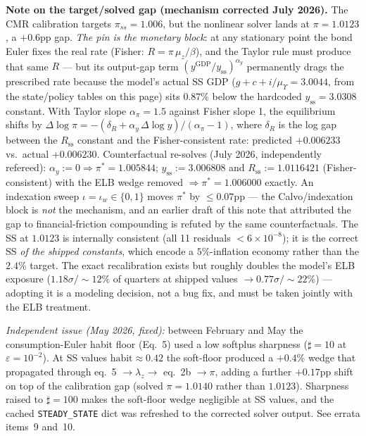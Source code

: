 \documentclass[11pt]{article}
\begin{document}
\begin{table}[h!]
\begin{minipage}[t]{0.45\linewidth}
\textbf{Note on the target/solved gap (mechanism corrected July 2026).}
The CMR calibration targets $\pi_{ss} = 1.006$, but the nonlinear solver
lands at $\pi = 1.0123$, a $+0.6$pp gap. \emph{The pin is the monetary
block}: at any stationary point the bond Euler fixes the real rate
(Fisher: $R = \pi\,\mu_z/\beta$), and the Taylor rule must produce that
same $R$ --- but its output-gap term $(y^{\text{GDP}}/y_{\text{ss}})^{\alpha_y}$
permanently drags the prescribed rate because the model's actual SS GDP
($g + c + i/\mu_\Upsilon = 3.0044$, from the state/policy tables on this
page) sits $0.87\%$ below the hardcoded $y_{\text{ss}} = 3.0308$
constant. With Taylor slope $\alpha_\pi = 1.5$ against Fisher slope 1,
the equilibrium shifts by
$\Delta\log\pi = -(\delta_R + \alpha_y\,\Delta\log y)/(\alpha_\pi - 1)$,
where $\delta_R$ is the log gap between the $R_{\text{ss}}$ constant and
the Fisher-consistent rate: predicted $+0.006233$ vs.\ actual
$+0.006230$. Counterfactual re-solves (July 2026, independently
refereed): $\alpha_y := 0 \Rightarrow \pi^* = 1.005844$;
$y_{\text{ss}} := 3.006808$ and $R_{\text{ss}} := 1.0116421$ (Fisher-consistent)
with the ELB wedge removed $\Rightarrow \pi^* = 1.006000$ exactly. An
indexation sweep $\iota = \iota_w \in \{0, 1\}$ moves $\pi^*$ by
$\leq 0.07$pp --- the Calvo/indexation block is \emph{not} the
mechanism, and an earlier draft of this note that attributed the gap to
financial-friction compounding is refuted by the same counterfactuals.
The SS at $1.0123$ is internally consistent (all 11 residuals
$< 6\times 10^{-8}$); it is the correct SS \emph{of the shipped
constants}, which encode a $5\%$-inflation economy rather than the
$2.4\%$ target. The exact recalibration exists but roughly doubles the
model's ELB exposure ($1.18\sigma/{\sim}12\%$ of quarters at shipped
values $\to 0.77\sigma/{\sim}22\%$) --- adopting it is a modeling
decision, not a bug fix, and must be taken jointly with the ELB
treatment.

\emph{Independent issue (May 2026, fixed):} between February and May
the consumption-Euler habit floor (Eq.~5) used a low softplus sharpness
($\sharp = 10$ at $\varepsilon = 10^{-2}$). At SS values
$\text{habit} \approx 0.42$ the soft-floor produced a $+0.4\%$ wedge
that propagated through eq.~5 $\to \lambda_z \to$ eq.~2b $\to \pi$,
adding a further $+0.17$pp shift on top of the calibration gap
(solved $\pi = 1.0140$ rather than $1.0123$). Sharpness raised to
$\sharp = 100$ makes the soft-floor wedge negligible at SS values, and
the cached \texttt{STEADY\_STATE} dict was refreshed to the corrected
solver output. See errata items~9 and~10.
\end{minipage}
\end{table}
\end{document}
